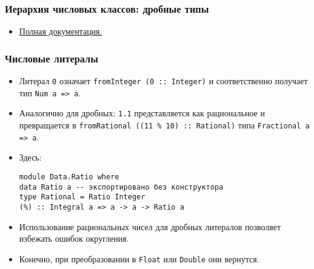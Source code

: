 \documentclass[10pt]{beamer}
\begin{document}
\begin{frame}[fragile]
  \frametitle{Иерархия числовых классов: дробные типы}
  \begin{itemize}
    \begin{lstlisting}[basicstyle=\ttfamily\small]
class Fractional a => Floating a where 
    exp, log, sqrt, (**), logBase, 
    pi, sin, cos, ...

class (Real a, Fractional a) => RealFrac a where 
    properFraction :: Integral b => a -> (b, a)
    truncate, round, ceiling, floor :: 
        Integral b => a -> b

class (RealFrac a, Floating a) => RealFloat a where
    isNaN, isInfinite :: a -> Bool
    ...
    
fromIntegral :: (Integral a, Num b) => a -> b
realToFrac :: (Real a, Fractional b) => a -> b
\end{lstlisting}
    \item \href{http://hackage.haskell.org/package/base-4.10.1.0/docs/Prelude.html#g:6}{Полная документация.}
  \end{itemize}
\end{frame}

\begin{frame}[fragile]
  \frametitle{Числовые литералы}
  \begin{itemize}
    \item Литерал \lstinline|0| означает \lstinline|fromInteger (0 :: Integer)| и соответственно получает тип \pause\lstinline|Num a => a|.
    \item Аналогично для дробных: \lstinline|1.1| представляется как рациональное и превращается в \lstinline|fromRational ((11 % 10) :: Rational)| типа \lstinline|Fractional a => a|.
    \item Здесь:
          \begin{lstlisting}
module Data.Ratio where
data Ratio a -- экспортировано без конструктора
type Rational = Ratio Integer
(%) :: Integral a => a -> a -> Ratio a
\end{lstlisting}
          \pause
    \item Использование рациональных чисел для дробных литералов позволяет избежать ошибок округления.\pause
    \item Конечно, при преобразовании в \lstinline|Float| или \lstinline|Double| они вернутся.
  \end{itemize}
\end{frame}
\end{document}
